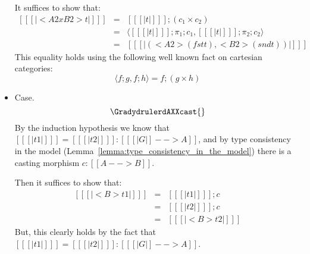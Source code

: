 \begin{itemize}
  It suffices to show that:
  \[
  \begin{array}{lll}
    [[ [| <A2 x B2>t |] ]]
    & = & [[ [| t |] ]];(c_1 \times c_2)\\
    & = & \langle [[ [| t |] ]];\pi_1;c_1 , [[ [| t |] ]];\pi_2;c_2 \rangle\\
    & = & [[ [| (<A2>(fst t),<B2>(snd t)) |] ]]
  \end{array}
  \]
  This equality holds using the following well known fact on
  cartesian categories:
  \[
  \langle f;g,f;h \rangle = f;(g \times h)
  \]

\item[] Case.
  \[
  \GradydrulerdAXXcast{} 
  \]
  By the induction hypothesis we know that
  $[[ [| t1 |] ]] = [[ [| t2 |] ]] : [[ [| G |] --> A]]$, and by
  type consistency in the model
  (Lemma~\ref{lemma:type_consistency_in_the_model}) there is a
  casting morphism $c : [[A --> B]]$.

  Then it suffices to show that:
  \[
  \begin{array}{lll}
    [[ [| <B>t1 |] ]]
    & = & [[ [| t1 |] ]];c\\
    & = & [[ [| t2 |] ]];c\\
    & = & [[ [| <B>t2 |] ]]
  \end{array}
  \]
  But, this clearly holds by the fact that $[[ [| t1 |] ]] = [[ [| t2 |] ]] : [[ [| G |] --> A]]$.
\end{itemize}

